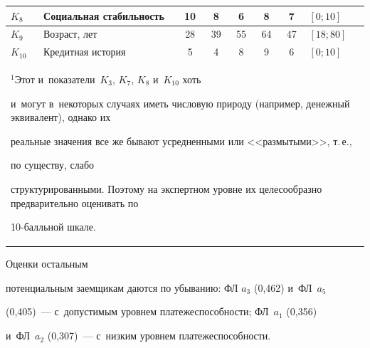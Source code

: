 \begin{table}
\begin{center}
\begin{tabular}{|l|l|c|c|c|c|c|l|}
\hline

$K_8$&Социальная стабильность&10&8&6&8&7&\hspace*{4mm}$[0; 10]$\\

\hline

$K_9$&Возраст, лет&28&39&55&64&47&\hspace*{4mm}$[18; 80]$\\

\hline

$K_{10}$&Кредитная история&5&4&8&9&6&\hspace*{4mm}$[0; 10]$\\

\hline

\multicolumn{8}{p{128mm}}{\footnotesize \hspace*{2mm}$^1$Этот и~показатели~$K_3$, $K_7$, $K_8$ и~$K_{10}$ хоть 

и~могут в~некоторых случаях иметь числовую природу (например, денежный эквивалент), однако их 

реальные значения все же бывают усредненными или <<размытыми>>, т.\,е., 

по существу, слабо 

структурированными. Поэтому на экспертном уровне их целесообразно предварительно оценивать по 

10-балль\-ной шкале.}

\end{tabular}

\end{center}

\vspace*{-12pt}

\end{table}

Оценки остальным 

потенциальным заемщикам даются по убыванию: ФЛ $a_3$ (0,462) и~ФЛ~$a_5$ 

(0,405)~--- с~допустимым уровнем платежеспособности; ФЛ~$a_1$ (0,356) 

и~ФЛ~$a_2$ (0,307)~--- с~низким уровнем платежеспособности. 



